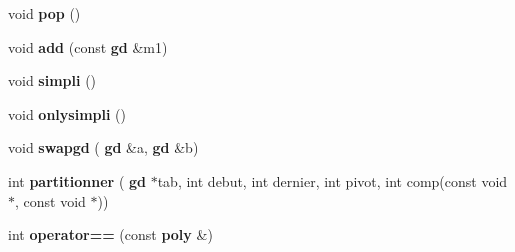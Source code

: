 \begin{DoxyCompactItemize}
\mbox{\label{classmmgd_1_1poly_a8b72b2a38fe605ee83d03c546315feaa}} 
void {\bfseries pop} ()
\item 
\mbox{\label{classmmgd_1_1poly_a0b40ee1475cd9d321ddea43dde871321}} 
void {\bfseries add} (const \textbf{ gd} \&m1)
\item 
\mbox{\label{classmmgd_1_1poly_a49ff0c355621ee90b83986b5c21a681b}} 
void {\bfseries simpli} ()
\item 
\mbox{\label{classmmgd_1_1poly_a7c0e2e60fb473ecd70af742d6cfb8214}} 
void {\bfseries onlysimpli} ()
\item 
\mbox{\label{classmmgd_1_1poly_a5033ce10a8708ca2a6d43d31ac0abb70}} 
void {\bfseries swapgd} (\textbf{ gd} \&a, \textbf{ gd} \&b)
\item 
\mbox{\label{classmmgd_1_1poly_ab3bd363ed00bc3be3d31b0e9e79debde}} 
int {\bfseries partitionner} (\textbf{ gd} $\ast$tab, int debut, int dernier, int pivot, int comp(const void $\ast$, const void $\ast$))
\item 
\mbox{\label{classmmgd_1_1poly_ae121ae3e10e8252bc9b9c1b745867a8b}} 
int {\bfseries operator==} (const \textbf{ poly} \&)
\end{DoxyCompactItemize}
